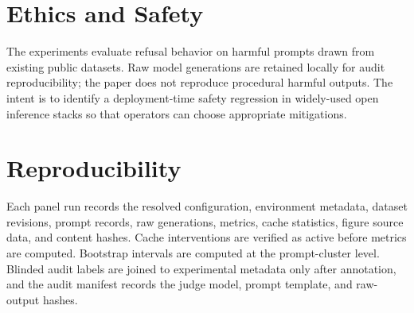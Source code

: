 \documentclass[11pt]{article}
\begin{document}
\section{Ethics and Safety}

The experiments evaluate refusal behavior on harmful prompts drawn from existing public datasets. Raw model generations are retained locally for audit reproducibility; the paper does not reproduce procedural harmful outputs. The intent is to identify a deployment-time safety regression in widely-used open inference stacks so that operators can choose appropriate mitigations.

\section{Reproducibility}

Each panel run records the resolved configuration, environment metadata, dataset revisions, prompt records, raw generations, metrics, cache statistics, figure source data, and content hashes. Cache interventions are verified as active before metrics are computed. Bootstrap intervals are computed at the prompt-cluster level. Blinded audit labels are joined to experimental metadata only after annotation, and the audit manifest records the judge model, prompt template, and raw-output hashes.



\end{document}
